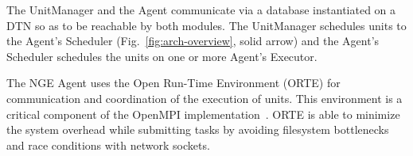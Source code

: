 The UnitManager and the Agent communicate via a database instantiated on a
DTN so as to be reachable by both modules. The UnitManager schedules units to
the Agent's Scheduler (Fig.~\ref{fig:arch-overview}, solid arrow) and the
Agent's Scheduler schedules the units on one or more Agent's Executor.

The NGE Agent uses the Open Run-Time Environment (ORTE) for communication and
coordination of the execution of units. This environment is a critical
component of the OpenMPI implementation~\cite{castain05:_open_rte}.
ORTE is able to minimize the system overhead while submitting tasks by
avoiding filesystem bottlenecks and race conditions with network sockets.